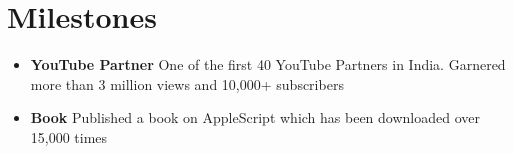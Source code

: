 \documentclass[a4paper,12pt]{article} %
\newcommand\zeroSpacing{0em}
\newcommand\sectionSpacing{0.5em}
\newcommand{\generalListStart}{\vspace{-0.5em}\begin{itemize}[leftmargin=2em]\setlength\itemsep{-0.4em}}
\newcommand{\generalListEnd}{\end{itemize}\vspace{\zeroSpacing}}
\newcommand{\oneKeyValuePairElement}[2]{
	\item \textbf{#1}{ #2}
}
\begin{document}

\vspace{\sectionSpacing}\section*{Milestones}

\generalListStart
	\oneKeyValuePairElement{YouTube Partner}{One of the first 40 YouTube Partners in India. Garnered more than 3 million views and 10,000+ subscribers}
	\oneKeyValuePairElement{Book}{Published a book on AppleScript which has been downloaded over 15,000 times}
\generalListEnd
\end{document}
